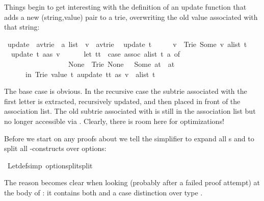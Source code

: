 \begin{isabellebody}
%
\begin{isamarkuptext}%
Things begin to get interesting with the definition of an update function
that adds a new (string,value) pair to a trie, overwriting the old value
associated with that string:%
\end{isamarkuptext}%
\ update\ {\isacharcolon}{\isacharcolon}\ {\isachardoublequote}{\isacharparenleft}{\isacharprime}a{\isacharcomma}{\isacharprime}v{\isacharparenright}trie\ {\isasymRightarrow}\ {\isacharprime}a\ list\ {\isasymRightarrow}\ {\isacharprime}v\ {\isasymRightarrow}\ {\isacharparenleft}{\isacharprime}a{\isacharcomma}{\isacharprime}v{\isacharparenright}trie{\isachardoublequote}\isanewline
{}\isanewline
\ \ {\isachardoublequote}update\ t\ {\isacharbrackleft}{\isacharbrackright}\ \ \ \ \ v\ {\isacharequal}\ Trie\ {\isacharparenleft}Some\ v{\isacharparenright}\ {\isacharparenleft}alist\ t{\isacharparenright}{\isachardoublequote}\isanewline
\ \ {\isachardoublequote}update\ t\ {\isacharparenleft}a{\isacharhash}as{\isacharparenright}\ v\ {\isacharequal}\isanewline
\ \ \ \ \ {\isacharparenleft}let\ tt\ {\isacharequal}\ {\isacharparenleft}case\ assoc\ {\isacharparenleft}alist\ t{\isacharparenright}\ a\ of\isanewline
\ \ \ \ \ \ \ \ \ \ \ \ \ \ \ \ \ \ None\ {\isasymRightarrow}\ Trie\ None\ {\isacharbrackleft}{\isacharbrackright}\ {\isacharbar}\ Some\ at\ {\isasymRightarrow}\ at{\isacharparenright}\isanewline
\ \ \ \ \ \ in\ Trie\ {\isacharparenleft}value\ t{\isacharparenright}\ {\isacharparenleft}{\isacharparenleft}a{\isacharcomma}update\ tt\ as\ v{\isacharparenright}\ {\isacharhash}\ alist\ t{\isacharparenright}{\isacharparenright}{\isachardoublequote}%
\begin{isamarkuptext}%
\noindent
The base case is obvious. In the recursive case the subtrie
 associated with the first letter  is extracted,
recursively updated, and then placed in front of the association list.
The old subtrie associated with  is still in the association list
but no longer accessible via . Clearly, there is room here for
optimizations!

Before we start on any proofs about  we tell the simplifier to
expand all s and to split all -constructs over
options:%
\end{isamarkuptext}%
\ Let{\isacharunderscore}def{\isacharbrackleft}simp{\isacharbrackright}\ option{\isachardot}split{\isacharbrackleft}split{\isacharbrackright}%
\begin{isamarkuptext}%
\noindent
The reason becomes clear when looking (probably after a failed proof
attempt) at the body of : it contains both
 and a case distinction over type .


\end{isamarkuptext}
\end{isabellebody}
